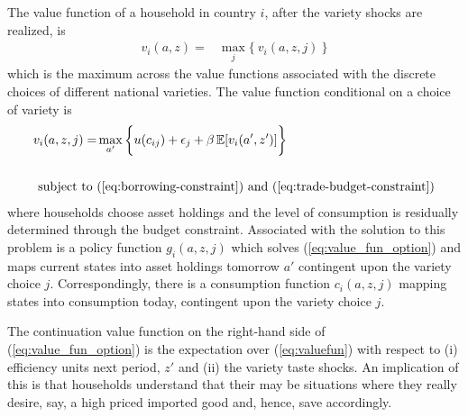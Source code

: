 \documentclass[12pt,pdftex]{article}
\begin{document}
\begin{onehalfspacing}
The value function of a household in country $i$, after the variety shocks are realized, is
\begin{align}
v_{i}(a, z) = &  \max_{j} \big  \{ \  v_{i}(a, z, j)  \ \big \}
\label{eq:valuefun}
\end{align}
which is the maximum across the value functions associated with the discrete choices of different national varieties. The value function conditional on a choice of variety is
\begin{align}
v_{i}(a, z, j) = &  \max_{\ a' \ }\bigg  \{ u(c_{ij}) + \epsilon_{j}  + \beta \, \mathbb{E} [v_{i}(a', z')]  \bigg\}
\label{eq:value_fun_option} \\
\nonumber \\
\mbox{subject to}  \ & (\ref{eq:borrowing-constraint}) \  \mathrm{and} \ (\ref{eq:trade-budget-constraint}) \nonumber
\end{align}
where households choose asset holdings and the level of consumption is residually determined through the budget constraint. Associated with the solution to this problem is a policy function $g_{i}(a,z, j)$ which solves (\ref{eq:value_fun_option}) and maps current states into asset holdings tomorrow $a'$ contingent upon the variety choice $j$. Correspondingly, there is a consumption function $c_{i}(a,z, j)$ mapping states into consumption today, contingent upon the variety choice $j$.

The continuation value function on the right-hand side of (\ref{eq:value_fun_option}) is the expectation over (\ref{eq:valuefun}) with respect to (i) efficiency units next period, $z'$ and (ii) the variety taste shocks. An implication of this is that households understand that their may be situations where they really desire, say, a high priced imported good and, hence, save accordingly.


\end{onehalfspacing}
\end{document}
